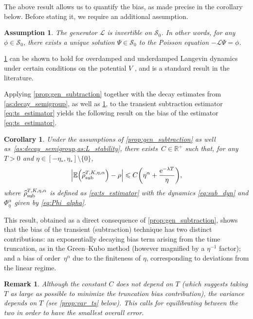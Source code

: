 \documentclass[11pt]{article}
\newcommand{\E}{\mathbb{E}}
\newcommand{\R}{\mathbb{R}}
\newcommand{\e}{\mathrm{e}}
\renewcommand{\L}{\mathcal{L}}
\renewcommand{\S}{\mathscr{S}}
\renewcommand{\leq}{\leqslant}
\DeclarePairedDelimiter\paren{\lparen}{\rparen}
\newtheorem{corollary}[theorem]{Corollary}
\newtheorem{assumption}{Assumption}
\newtheorem{remark}[theorem]{Remark}
\theoremstyle{definition}
\newcommand{\estTmp}{\widehat{\rho}}
\newcommand{\aTSest}{\estTmp^{T,K,\eta,\alpha}_{\rm sub}} %
\begin{document}
The above result allows us to quantify the bias, as made precise in the corollary below. Before stating it, we require an additional assumption.

\begin{assumption}
\label{as:L_stability}
The generator $\L$ is invertible on $\S_0$. In other words, for any $\phi\in\S_0$, there exists a unique solution $\Psi \in \S_0$ to the Poisson equation $-\L\Psi = \phi$.
\end{assumption}

\cref{as:L_stability} can be shown to hold for overdamped and underdamped Langevin dynamics under certain conditions on the potential $V$ \cite{talay2002,kopec2014,kopec2015}, and is a standard result in the literature.

Applying \cref{prop:gen_subtraction} together with the decay estimates from \cref{as:decay_semigroup}, as well as \cref{as:L_stability}, to the transient subtraction estimator \eqref{eq:ts_estimator} yields the following result on the bias of the estimator \eqref{eq:ts_estimator}.

\begin{corollary}
\label{cor:gk_equiv}
Under the assumptions of \cref{prop:gen_subtraction} as well as~\cref{as:decay_semigroup,as:L_stability}, there exists~$C\in\R^+$ such that, for any $T>0$ and $\eta \in [-\eta_*, \eta_*] \setminus \{0\}$,
\begin{equation}
\notag
	\left|\E\paren*{\aTSest} - \rho\right| \leq C\paren*{\eta^\alpha + \frac{\e^{-\lambda T}}{\eta}},
\end{equation}
where $\aTSest$ is defined as \eqref{eq:ts_estimator} with the dynamics \eqref{eq:sub_dyn} and $\Phi_\eta^\alpha$ given by \eqref{eq:Phi_alpha}.
\end{corollary}

This result, obtained as a direct consequence of \cref{prop:gen_subtraction}, shows that the bias of the transient (subtraction) technique has two distinct contributions: an exponentially decaying bias term arising from the time truncation, as in the Green--Kubo method (however magnified by a $\eta^{-1}$ factor); and a bias of order~$\eta^\alpha$ due to the finiteness of $\eta$, corresponding to deviations from the linear regime.

\begin{remark}
	Although the constant $C$ does not depend on $T$ (which suggests taking $T$ as large as possible to minimize the truncation bias contribution), the variance depends on $T$ (see \cref{prop:var_ts} below). This calls for equilibrating between the two in order to have the smallest overall error.
\end{remark}
\end{document}
